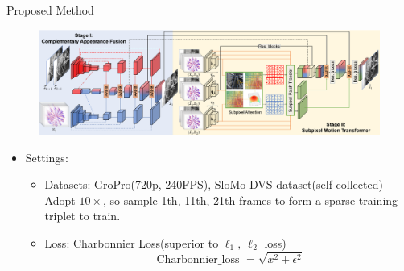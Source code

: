 \documentclass[aspectratio=43]{beamer}
\begin{document}
\begin{frame}{Proposed Method}
{\begin{figure}
				\centering\includegraphics[width=0.95\linewidth]{images/overview.png}
			\end{figure}
			\begin{itemize}
				\item Settings:
				\begin{itemize}
					\item Datasets: GroPro(720p, 240FPS), SloMo-DVS dataset(self-collected) \\
					Adopt \alert{$ 10\times $}, so sample 1th, 11th, 21th frames to form a \alert{sparse} training triplet to train.
					\item Loss: Charbonnier Loss(superior to $ \ell_1,\ \ell_2 $ loss)
					\begin{equation}
						\text { Charbonnier\_loss }=\sqrt{x^{2}+\epsilon^{2}}
					\end{equation}
				\end{itemize}
			\end{itemize}
		}
	\end{frame}
\end{document}
